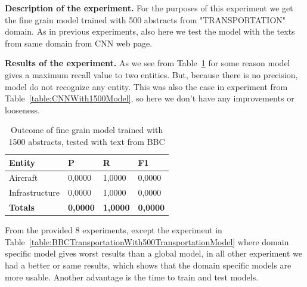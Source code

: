 \documentclass[thesis=M,english]{FITthesis}[2018/05/30]
\begin{document}
\textbf{Description of the experiment.} For the purposes of this experiment we get the fine grain model trained with 500 abstracts from "TRANSPORTATION" domain. As in previous experiments, also here we test the model with the texts from same domain from CNN web page.

\textbf{Results of the experiment.} As we see from Table~\ref{table:CNNTransportationWith500TransportationModel} for some reason model gives a maximum recall value to two entities. But, because there is no precision, model do not recognize any entity. This was also the case in experiment from Table~\ref{table:CNNWith1500Model}, so here we don't have any improvements or looseness.

	\begin{table}[H]\centering
	\begin{tabular}{|l|l|l|l|}
		\hline {\textbf{Entity}} & {\textbf{P}} & {\textbf{R}} & {\textbf{F1}}\\\hline
        Aircraft & 0,0000 & 1,0000 & 0,0000\\
   		Infrastructure & 0,0000 & 1,0000 & 0,0000\\\hline  
		\textbf{Totals} & \textbf{0,0000} & \textbf{1,0000} & \textbf{0,0000}\\\hline
	\end{tabular}			
		\caption{Outcome of fine grain model trained with 1500 abstracts, tested with text from BBC\label{table:CNNTransportationWith500TransportationModel}}
	\end{table}	
	

From the provided 8 experiments, except the experiment in Table~\ref{table:BBCTransportationWith500TransportationModel} where domain specific model gives worst results than a global model, in all other experiment we had a better or same results, which shows that the domain specific models are more usable. Another advantage is the time to train and test models.
	
\end{document}
